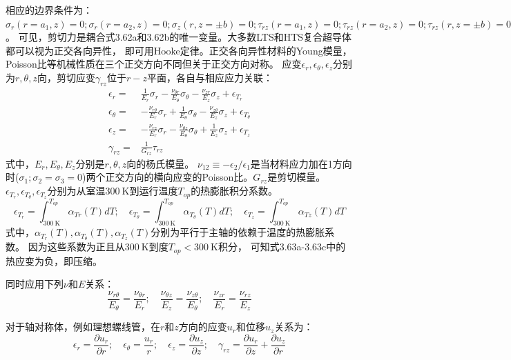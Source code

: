 相应的边界条件为：$\sigma_r(r=a_1,z)=0;\sigma_r(r=a_2,z)=0;\sigma_z(r,z=\pm b)=0;\tau_{rz}(r=a_1,z)=0;\tau_{rz}(r=a_2,z)=0;\tau_{rz}(r,z=\pm b)=0$。
可见，剪切力是耦合式3.62a和3.62b的唯一变量。大多数LTS和HTS复合超导体都可以视为正交各向异性，
即可用Hooke定律。正交各向异性材料的Young模量，Poisson比等机械性质在三个正交方向不同但关于正交方向对称。
应变$\epsilon_r,\epsilon_\theta,\epsilon_z$分别为$r,\theta,z$向，剪切应变$\gamma_{rz}$位于$r-z$平面，各自与相应应力关联：
\begin{subequations}
	\begin{align}
\epsilon_r=&\frac{1}{E_r}\sigma_r-\frac{\nu_{\theta r}}{E_{\theta}}\sigma_{\theta}-\frac{\nu_{zr}}{E_z}\sigma_z+\epsilon_{T_r}\\
\epsilon_\theta=&-\frac{\nu_{r\theta}}{E_r}\sigma_r+\frac{1}{E_{\theta}}\sigma_{\theta}-\frac{\nu_{z\theta}}{E_z}\sigma_z+\epsilon_{T_\theta}\\
\epsilon_z=&-\frac{\nu_{rz}}{E_r}\sigma_r-\frac{\nu_{\theta z}}{E_{\theta}}\sigma_{\theta}+\frac{1}{E_z}\sigma_z+\epsilon_{T_z}\\
\gamma_{rz}=&\frac{1}{G_{{rz}}}\tau_{rz}
	\end{align}
\end{subequations}
式中，$E_r, E_\theta, E_z$分别是$r,\theta,z$向的杨氏模量。
$\nu_{12}\equiv -\epsilon_2/\epsilon_1$是当材料应力加在1方向时($\sigma_1;\sigma_2=\sigma_3=0$)两个正交方向的横向应变的Poisson比。$G_{rz}$是剪切模量。 
$\epsilon_{T_r},\epsilon_{T_\theta},\epsilon_{T_z}$分别为从室温$300\ \mathrm{K}$到运行温度$T_{op}$的热膨胀积分系数。
\begin{equation*}
\epsilon_{T_r}=\int_{300\ \mathrm{K}}^{T_{op}}\alpha_{Tr}(T)dT;\quad
\epsilon_{T_\theta}=\int_{300\ \mathrm{K}}^{T_{op}}\alpha_{T_\theta}(T)dT;\quad
\epsilon_{T_z}=\int_{300\ \mathrm{K}}^{T_{op}}\alpha_{Tz}(T)dT \tag{3.63e}
\end{equation*}
式中，$\alpha_{T_r}(T),\alpha_{T_\theta}(T),\alpha_{T_z}(T)$分别为平行于主轴的依赖于温度的热膨胀系数。
因为这些系数为正且从$300\ \mathrm{K}$到度$T_{op}<300\ \mathrm{K}$积分，
可知式3.63a-3.63c中的热应变为负，即压缩。

同时应用下列$\nu$和$E$关系：
\begin{equation*}
\frac{\nu_{r\theta}}{E_\theta}=\frac{\nu_{\theta r}}{E_r};\quad \frac{\nu_{\theta z}}{E_z}=\frac{\nu_{z\theta}}{E_\theta};\quad \frac{\nu_{zr}}{E_r}=\frac{\nu_{rz}}{E_z} \tag{3.63f}
\end{equation*}

对于轴对称体，例如理想螺线管，在$r$和$z$方向的应变$u_r$和位移$u_z$关系为：
\begin{equation*}
\epsilon_r=\frac{\partial {u_r}}{\partial r};\quad \epsilon_\theta=\frac{u_r}{r};\quad \epsilon_z=\frac{\partial {u_z}}{\partial z};\quad \gamma_{rz}=\frac{\partial {u_r}}{\partial z}+\frac{\partial {u_z}}{\partial r} \tag{3.63g}
\end{equation*}

